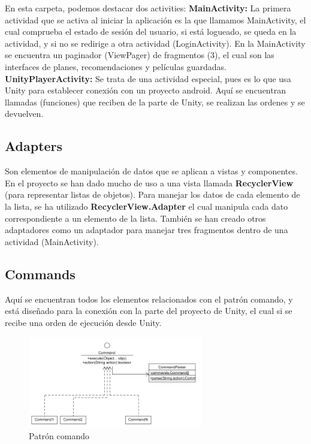 En esta carpeta, podemos destacar dos activities: \textbf{MainActivity:} La primera actividad que se activa al iniciar la aplicación es la que llamamos MainActivity, el cual comprueba el estado de sesión del usuario, si está logueado, se queda en la actividad, y si no se redirige a otra actividad (LoginActivity). En la MainActivity se encuentra un paginador (ViewPager) de fragmentos (3), el cual son las interfaces de planes, 
recomendaciones y películas guardadas. \textbf{UnityPlayerActivity:} Se trata de una actividad especial, pues es lo que usa Unity para establecer conexión con un proyecto android. Aquí se encuentran llamadas (funciones) que reciben de la parte de Unity, se realizan las ordenes y se devuelven.

\subsection{Adapters}
\label{makereference4.3.2} 
Son elementos de manipulación de datos que se aplican a vistas y componentes. En el proyecto se han dado mucho de uso a una vista llamada \textbf{RecyclerView} (para representar listas de objetos). Para manejar los datos de cada elemento de la lista, se ha utilizado \textbf{RecyclerView.Adapter} el cual manipula cada dato correspondiente a un elemento de la lista. También se han creado otros adaptadores como un adaptador para manejar tres fragmentos dentro de una actividad (MainActivity).

\subsection{Commands}
\label{makereference4.3.3}
Aquí se encuentran todos los elementos relacionados con el patrón comando, y está diseñado para la conexión con la parte del proyecto de Unity, el cual si se recibe una orden de ejecución desde Unity.

\begin{figure}[H]
    \centering
    \includegraphics[width=3in]{figures/chapter-4/command_pattern.png}
    \caption{Patrón comando}
\end{figure}

